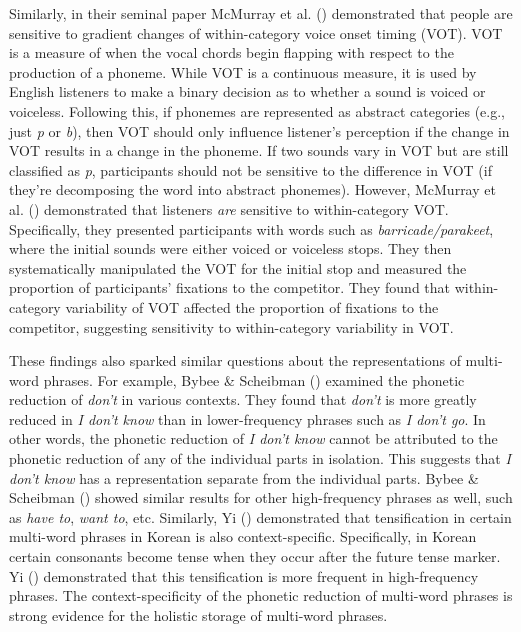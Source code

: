 \documentclass[
  12pt,
]{scrartcl}
\begin{document}
Similarly, in their seminal paper McMurray et al.
()
demonstrated that people are sensitive to gradient changes of
within-category voice onset timing (VOT). VOT is a measure of when the
vocal chords begin flapping with respect to the production of a phoneme.
While VOT is a continuous measure, it is used by English listeners to
make a binary decision as to whether a sound is voiced or voiceless.
Following this, if phonemes are represented as abstract categories
(e.g., just \emph{p} or \emph{b}), then VOT should only influence
listener's perception if the change in VOT results in a change in the
phoneme. If two sounds vary in VOT but are still classified as \emph{p},
participants should not be sensitive to the difference in VOT (if
they're decomposing the word into abstract phonemes). However, McMurray
et al.
()
demonstrated that listeners \emph{are} sensitive to within-category VOT.
Specifically, they presented participants with words such as
\emph{barricade/parakeet}, where the initial sounds were either voiced
or voiceless stops. They then systematically manipulated the VOT for the
initial stop and measured the proportion of participants' fixations to
the competitor. They found that within-category variability of VOT
affected the proportion of fixations to the competitor, suggesting
sensitivity to within-category variability in VOT.

These findings also sparked similar questions about the representations
of multi-word phrases. For example, Bybee \& Scheibman
() examined the phonetic
reduction of \emph{don't} in various contexts. They found that
\emph{don't} is more greatly reduced in \emph{I don't know} than in
lower-frequency phrases such as \emph{I don't go}. In other words, the
phonetic reduction of \emph{I don't know} cannot be attributed to the
phonetic reduction of any of the individual parts in isolation. This
suggests that \emph{I don't know} has a representation separate from the
individual parts. Bybee \& Scheibman
() showed similar
results for other high-frequency phrases as well, such as \emph{have
to}, \emph{want to}, etc. Similarly, Yi
() demonstrated that
tensification in certain multi-word phrases in Korean is also
context-specific. Specifically, in Korean certain consonants become
tense when they occur after the future tense marker. Yi
() demonstrated that
this tensification is more frequent in high-frequency phrases. The
context-specificity of the phonetic reduction of multi-word phrases is
strong evidence for the holistic storage of multi-word phrases.
\end{document}
